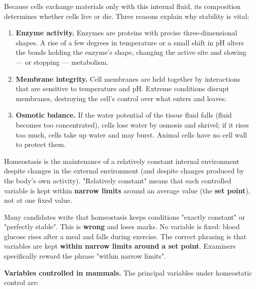 \documentclass[11pt]{article}
\newcommand{\cle}[1]{{\popxbold\color{popdark}#1}}
\begin{document}
Because cells exchange materials only with this internal fluid, its composition determines whether cells live or die. Three reasons explain why stability is vital:

\begin{enumerate}
\item \textbf{Enzyme activity.} Enzymes are proteins with precise three-dimensional shapes. A rise of a few degrees in temperature or a small shift in pH alters the bonds holding the enzyme's shape, changing the active site and slowing — or stopping — metabolism.
\item \textbf{Membrane integrity.} Cell membranes are held together by interactions that are sensitive to temperature and pH. Extreme conditions disrupt membranes, destroying the cell's control over what enters and leaves.
\item \textbf{Osmotic balance.} If the water potential of the tissue fluid falls (fluid becomes too concentrated), cells lose water by osmosis and shrivel; if it rises too much, cells take up water and may burst. Animal cells have no cell wall to protect them.
\end{enumerate}

\begin{definition}[Homeostasis]
\cle{Homeostasis} is the maintenance of a relatively constant internal environment despite changes in the external environment (and despite changes produced by the body's own activity). "Relatively constant" means that each controlled variable is kept within \textbf{narrow limits} around an average value (the \textbf{set point}), not at one fixed value.
\end{definition}

\begin{attention}
Many candidates write that homeostasis keeps conditions "exactly constant" or "perfectly stable". This is \textbf{wrong} and loses marks. No variable is fixed: blood glucose rises after a meal and falls during exercise. The correct phrasing is that variables are kept \textbf{within narrow limits around a set point}. Examiners specifically reward the phrase "within narrow limits".
\end{attention}

\textbf{Variables controlled in mammals.} The principal variables under homeostatic control are:
\end{document}
